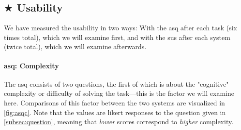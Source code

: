 \documentclass[../thesis]{subfiles}
\begin{document}
\subsection[Usability]{$\bigstar$ Usability}
We have measured the usability in two ways:
With the \gls{asq} after each task (six times total), which we will examine first, and with the \gls{sus} after each system (twice total), which we will examine afterwards.

\paragraph{\gls{asq}: Complexity}
The \gls{asq} consists of two questions, the first of which is about the "cognitive" complexity or difficulty of solving the task---this is the factor we will examine here.
Comparisons of this factor between the two systems are visualized in \cref{fig:asqc}.
Note that the values are \gls{likert} responses to the question given in \cref{subsec:question}, meaning that \emph{lower} scores correspond to \emph{higher} complexity.
\end{document}
